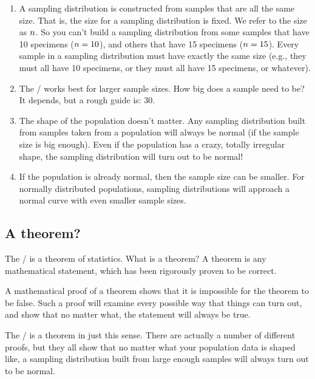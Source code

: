 \documentclass[../../../main.tex]{subfiles}
\begin{document}
\begin{enumerate}
  \item A sampling distribution is constructed from samples that are all the same size. That is, the size for a sampling distribution is fixed. We refer to the size as $\samplesize/$. So you can't build a sampling distribution from some samples that have 10 specimens ($\samplesize/ = 10$), and others that have 15 specimens ($\samplesize/ = 15$). Every sample in a sampling distribution must have exactly the same size (e.g., they must all have 10 specimens, or they must all have 15 specimens, or whatever). 
  
  \item The \CLT/ works best for larger sample sizes. How big does a sample need to be? It depends, but a rough guide is: 30. 
  
  \item The shape of the population doesn't matter. Any sampling distribution built from samples taken from a population will always be normal (if the sample size is big enough). Even if the population has a crazy, totally irregular shape, the sampling distribution will turn out to be normal!
  
  \item If the population is already normal, then the sample size can be smaller. For normally distributed populations, sampling distributions will approach a normal curve with even smaller sample sizes.
  

\end{enumerate}


\subsection{A theorem?}

The \CLT/ is a theorem of statistics. What is a theorem? A theorem is any mathematical statement, which has been rigorously proven to be correct. 

A mathematical proof of a theorem shows that it is impossible for the theorem to be false. Such a proof will examine every possible way that things can turn out, and show that no matter what, the statement will always be true.

The \CLT/ is a theorem in just this sense. There are actually a number of different proofs, but they all show that no matter what your population data is shaped like, a sampling distribution built from large enough samples will always turn out to be normal.
\end{document}
